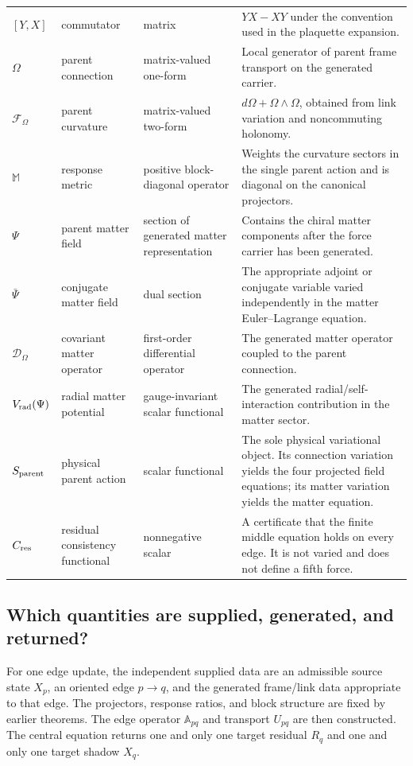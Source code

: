 \documentclass[11pt]{article}
\numberwithin{equation}{section}
\theoremstyle{remark}
\begin{document}
\begin{longtable}{p{2.1cm}p{3.1cm}p{3.2cm}p{5.6cm}}
$[Y,X]$ & commutator & matrix & $YX-XY$ under the convention used in the plaquette expansion.\\
$\Omega$ & parent connection & matrix-valued one-form & Local generator of parent frame transport on the generated carrier.\\
$\mathcal F_{\Omega}$ & parent curvature & matrix-valued two-form & $d\Omega+\Omega\wedge\Omega$, obtained from link variation and noncommuting holonomy.\\
$\mathbb M$ & response metric & positive block-diagonal operator & Weights the curvature sectors in the single parent action and is diagonal on the canonical projectors.\\
$\Psi$ & parent matter field & section of generated matter representation & Contains the chiral matter components after the force carrier has been generated.\\
$\bar\Psi$ & conjugate matter field & dual section & The appropriate adjoint or conjugate variable varied independently in the matter Euler--Lagrange equation.\\
$\mathcal D_{\Omega}$ & covariant matter operator & first-order differential operator & The generated matter operator coupled to the parent connection.\\
$V_{\rm rad}(\Psi)$ & radial matter potential & gauge-invariant scalar functional & The generated radial/self-interaction contribution in the matter sector.\\
$S_{\rm parent}$ & physical parent action & scalar functional & The sole physical variational object. Its connection variation yields the four projected field equations; its matter variation yields the matter equation.\\
$C_{\rm res}$ & residual consistency functional & nonnegative scalar & A certificate that the finite middle equation holds on every edge. It is not varied and does not define a fifth force.\\
\bottomrule
\end{longtable}

\subsection*{Which quantities are supplied, generated, and returned?}
For one edge update, the independent supplied data are an admissible source state $X_p$, an oriented edge $p\to q$, and the generated frame/link data appropriate to that edge. The projectors, response ratios, and block structure are fixed by earlier theorems. The edge operator $\mathbb A_{pq}$ and transport $U_{pq}$ are then constructed. The central equation returns one and only one target residual $R_q$ and one and only one target shadow $X_q$.
\end{document}

